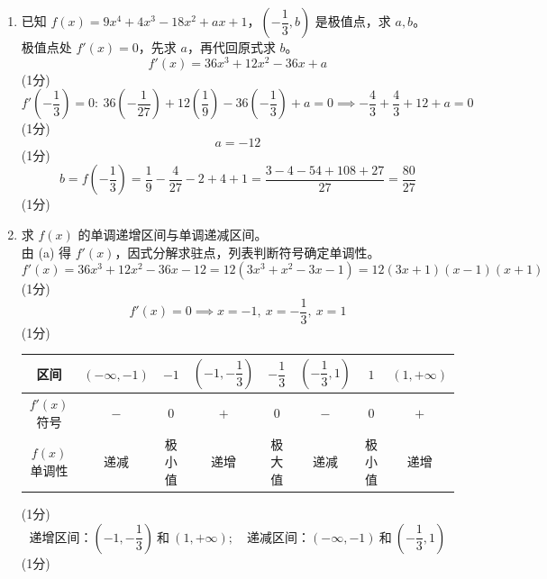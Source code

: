 \documentclass[12pt,a4paper]{exam-zh}
\begin{document}
\begin{solution}
    \begin{enumerate}[label=(\alph*)]
        \item 已知 $f(x) = 9x^4 + 4x^3 - 18x^2 + ax + 1$，$\left(-\dfrac13,b\right)$ 是极值点，求 $a,b$。 \\
        极值点处 $f'(x)=0$，先求 $a$，再代回原式求 $b$。
        \[
            \displaystyle f'(x) = 36x^3 + 12x^2 - 36x + a
        \] \hfill (1分) \\
        \[
            \displaystyle f'\left(-\frac13\right)=0:\ 36\left(-\frac{1}{27}\right)+12\left(\frac19\right)-36\left(-\frac13\right)+a=0 \implies -\frac43+\frac43+12+a=0
        \] \hfill (1分) \\
        \[
            \displaystyle a=-12
        \] \hfill (1分) \\
        \[
            \displaystyle b=f\left(-\frac13\right) = \frac19-\frac{4}{27}-2+4+1 = \frac{3-4-54+108+27}{27}=\frac{80}{27}
        \] \hfill (1分)

        \item 求 $f(x)$ 的单调递增区间与单调递减区间。 \\
        由 (a) 得 $f'(x)$，因式分解求驻点，列表判断符号确定单调性。
        \[
            \displaystyle f'(x)=36x^3+12x^2-36x-12=12(3x^3+x^2-3x-1)=12(3x+1)(x-1)(x+1)
        \] \hfill (1分) \\
        \[
            \displaystyle f'(x)=0 \implies x=-1,\ x=-\frac13,\ x=1
        \] \hfill (1分) \\
        \begin{center}
        \begin{tabular}{c|c|c|c|c|c|c|c}
            \hline
            区间 & $(-\infty, -1)$ & $-1$ & $\left(-1, -\dfrac{1}{3}\right)$ & $-\dfrac{1}{3}$ & $\left(-\dfrac{1}{3}, 1\right)$ & $1$ & $(1, +\infty)$ \\
            \hline
            $f'(x)$ 符号 & $-$ & $0$ & $+$ & $0$ & $-$ & $0$ & $+$ \\
            \hline
            $f(x)$ 单调性 & 递减 & 极小值 & 递增 & 极大值 & 递减 & 极小值 & 递增 \\
            \hline
        \end{tabular}
        \end{center} \hfill (1分) \\
        \[
            \displaystyle \text{递增区间：}\left(-1,-\frac13\right)\ \text{和}\ (1,+\infty);\quad \text{递减区间：}(-\infty,-1)\ \text{和}\ \left(-\frac13,1\right)
        \] \hfill (1分)
    \end{enumerate}
\end{solution}
\end{document}
